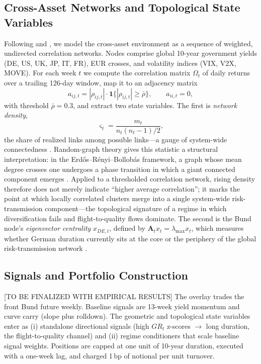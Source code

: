 \documentclass[12pt]{article}
\begin{document}
\subsection{Cross-Asset Networks and Topological State Variables}\label{sec:network}

Following \citet{konstantinov2025unsupervised} and \citet{konstantinov2023networks}, we model the cross-asset environment as a sequence of weighted, undirected correlation networks. Nodes comprise global 10-year government yields (DE, US, UK, JP, IT, FR), EUR crosses, and volatility indices (VIX, V2X, MOVE). For each week $t$ we compute the correlation matrix $\Omega_t$ of daily returns over a trailing 126-day window, map it to an adjacency matrix
\begin{equation}
a_{ij,t} = |\rho_{ij,t}| \cdot \mathbf{1}\{|\rho_{ij,t}| \ge \bar\rho\}, \qquad a_{ii,t}=0,
\end{equation}
with threshold $\bar\rho=0.3$, and extract two state variables. The first is \emph{network density},
\begin{equation}
\varsigma_t = \frac{m_t}{n_t(n_t-1)/2},
\end{equation}
the share of realized links among possible links---a gauge of system-wide connectedness \citep{konstantinov2025unsupervised}. Random-graph theory gives this statistic a structural interpretation: in the Erd\H{o}s--R\'enyi--Bollob\'as framework, a graph whose mean degree crosses one undergoes a phase transition in which a giant connected component emerges \citep{erdos1960evolution, bollobas2001random}. Applied to a thresholded correlation network, rising density therefore does not merely indicate ``higher average correlation''; it marks the point at which locally correlated clusters merge into a single system-wide risk-transmission component---the topological signature of a regime in which diversification fails and flight-to-quality flows dominate. The second is the Bund node's \emph{eigenvector centrality} $x_{DE,t}$, defined by $\mathbf{A}_t x_t = \lambda_{\max} x_t$, which measures whether German duration currently sits at the core or the periphery of the global risk-transmission network \citep{konstantinov2023networks}.

\subsection{Signals and Portfolio Construction}\label{sec:signals}

[TO BE FINALIZED WITH EMPIRICAL RESULTS]
The overlay trades the front Bund future weekly. Baseline signals are 13-week yield momentum and curve carry (slope plus rolldown). The geometric and topological state variables enter as (i) standalone directional signals (high $GR_t$ z-scores $\rightarrow$ long duration, the flight-to-quality channel) and (ii) regime conditioners that scale baseline signal weights. Positions are capped at one unit of 10-year duration, executed with a one-week lag, and charged 1\,bp of notional per unit turnover.
\end{document}
